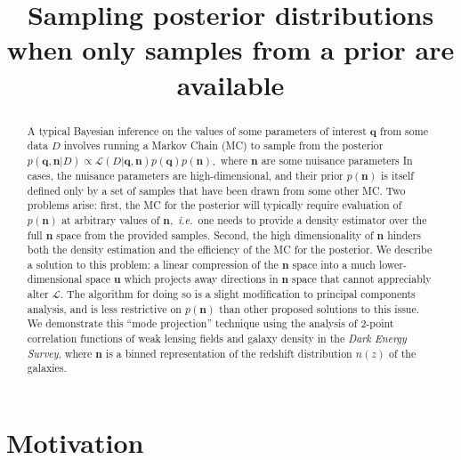 \documentclass[linenumbers, onecolumn, resetfootnote]{aastex7}
\newcommand{\ed}[1]{{\color{red}{#1}}}
\newcommand{\ie}{\textit{i.e.}}
\newcommand{\vecq}{\ensuremath{\mathbf{q}}}
\newcommand{\vecn}{\ensuremath{\mathbf{n}}}
\newcommand{\vecu}{\ensuremath{\mathbf{u}}}
\newcommand{\likeli}{\mathcal{L}}
\begin{document}
\title{Sampling posterior distributions when only samples from a prior are available}




\begin{abstract}
	\vspace{0.2in}
A typical Bayesian inference on the values of some parameters of
interest $\vecq$ from some data $D$ involves running a Markov Chain (MC) to sample
from the posterior $p(\vecq,\vecn | D) \propto \likeli(D | \vecq,\vecn)
p(\vecq) p(\vecn),$ where $\vecn$ are some nuisance parameters \ed{with
  separable prior.}  In \ed{some}
cases, the nuisance parameters are high-dimensional, and their
prior $p(\vecn)$ is itself defined only by a set of samples that have
been drawn from some other MC.  Two problems arise: first,
the MC for the posterior will typically require evaluation of
$p(\vecn)$ at arbitrary values of $\vecn,$ \ie\ one needs to provide a
density estimator over the full $\vecn$ space from the provided
samples.  Second, the high dimensionality of $\vecn$ hinders both the
density estimation and the efficiency of the MC for the posterior.  We
describe a solution to this problem: a linear compression of the
$\vecn$ space into a much lower-dimensional space $\vecu$ which
projects away directions in $\vecn$ space that cannot appreciably
alter $\likeli.$ The algorithm for doing so is a slight modification
to principal components analysis, and is less restrictive on
$p(\vecn)$ than other proposed solutions to this issue.
We demonstrate this ``mode projection'' technique using the analysis
of 2-point correlation functions of weak lensing fields and galaxy
density in the \textit{Dark Energy Survey}, where $\vecn$ is a binned representation of the redshift distribution
$n(z)$ of the galaxies.
\end{abstract}


\section{Motivation} \label{sec:intro}
\end{document}
